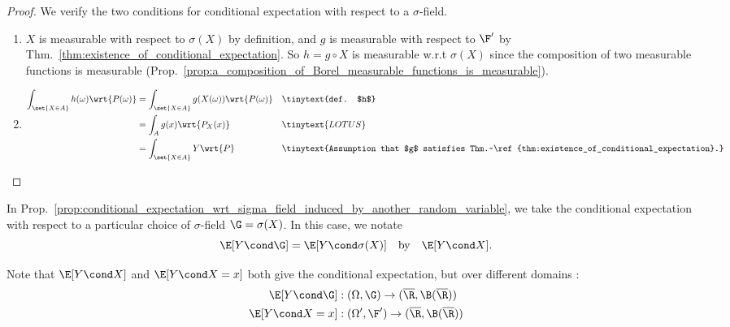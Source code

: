 \documentclass{article} %
\begin{document}
\begin{proof} 
We verify the two conditions for conditional expectation with respect to a $\sigma$-field.

\begin{enumerate}
	\item $X$ is measurable with respect to $\sigma(X)$ by definition, and $g$ is measurable with respect to $\F'$ by Thm.~\ref{thm:existence_of_conditional_expectation}. So $h=g \circ X$ is measurable w.r.t $\sigma(X)$ since the composition of two measurable functions is measurable (Prop.~\ref{prop:a_composition_of_Borel_measurable_functions_is_measurable}). 
\item \;
%
\begin{align*}
\int_{\set{X \in A}} h(\omega) \wrt{P(\omega)} &= \int_{\set{X \in A}} g(X(\omega)) \wrt{P(\omega)} && \tinytext{def. $h$} \\
&= \int_A g(x) \wrt{P_X(x)} && \tinytext{LOTUS} \\
&= \int_{\set{X \in A}} Y \wrt{P} && \tinytext{Assumption that $g$ satisfies Thm.~\ref{thm:existence_of_conditional_expectation}.} 	
\end{align*}
\end{enumerate}


\end{proof}


\begin{notation}
In Prop.~\ref{prop:conditional_expectation_wrt_sigma_field_induced_by_another_random_variable}, we take the conditional expectation with respect to a particular choice of $\sigma$-field $\G = \sigma(X)$.  In this case, we notate
\[ \E[Y \cond \G] = \E[Y \cond \sigma(X)]  \quad \text{by} \quad \E[Y \cond X].\]

Note that $\E[Y \cond X]$ and $\E[Y \cond X=x]$ both give the conditional expectation, but over different domains :
\begin{align*}
\E[Y \cond \G] &: (\Omega, \G) \to (\overline{\R}, \B(\overline{\R})) 	 \\
\E[Y \cond X = x] &: (\Omega', \F') \to (\overline{\R}, \B(\overline{\R}))
\end{align*}
\label{notation:conditional_expectation_of_random_variable_given_another_random_variable}
\end{notation}
\end{document}
